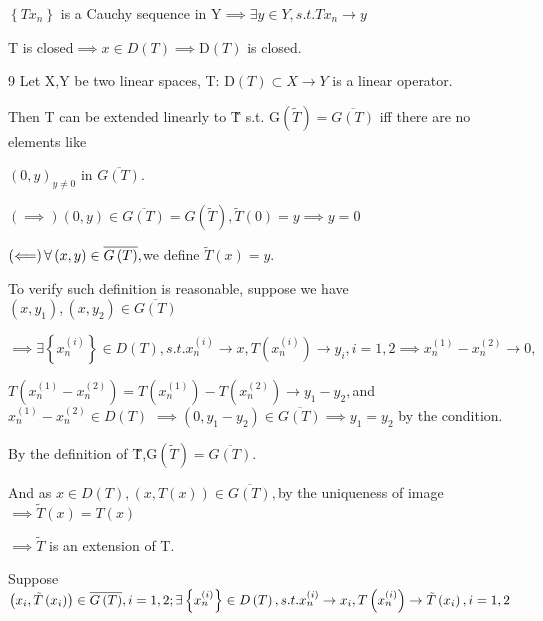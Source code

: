 \documentclass{article}
\begin{document}
\begin{CJK}{GBK}{song}
$\left\{ Tx_{n}\right\} $ is a Cauchy sequence in Y$\implies \exists y\in
Y,s.t.Tx_{n}\rightarrow y$

T is closed$\implies x\in D\left( T\right) \implies $D$\left( T\right) $ is
closed.

9 Let X,Y be two linear spaces, T: D$\left( T\right) \subset X\rightarrow Y$
is a linear operator.

Then T can be extended linearly to \~{T} s.t. G$\left( \tilde{T}\right) =%
\overline{G\left( T\right) }$ iff there are no elements like

$\left( 0,y\right) _{y\neq 0}$ in $\overline{G\left( T\right) }.$

$\left( \implies \right) \left( 0,y\right) \in \overline{G\left( T\right) }%
=G\left( \tilde{T}\right) ,\tilde{T}\left( 0\right) =y\implies y=0$

$\left( \Longleftarrow \right) \forall \left( x,y\right) \in \overline{%
G\left( T\right) },$we define $\tilde{T}\left( x\right) =y.$

To verify such definition is reasonable, suppose we have $\left(
x,y_{1}\right) ,\left( x,y_{2}\right) \in \overline{G\left( T\right) }$

$\implies \exists \left\{ x_{n}^{\left( i\right) }\right\} \in D\left(
T\right) ,s.t.x_{n}^{\left( i\right) }\rightarrow x,T\left( x_{n}^{\left(
i\right) }\right) \rightarrow y_{i},i=1,2\implies x_{n}^{\left( 1\right)
}-x_{n}^{\left( 2\right) }\rightarrow 0,$

$T\left( x_{n}^{\left( 1\right) }-x_{n}^{\left( 2\right) }\right) =T\left(
x_{n}^{\left( 1\right) }\right) -T\left( x_{n}^{\left( 2\right) }\right)
\rightarrow y_{1}-y_{2},$and $x_{n}^{\left( 1\right) }-x_{n}^{\left(
2\right) }\in D\left( T\right) $ $\implies \left( 0,y_{1}-y_{2}\right) \in 
\overline{G\left( T\right) }\implies y_{1}=y_{2}$ by the condition.

By the definition of \~{T},G$\left( \tilde{T}\right) =\overline{G\left(
T\right) }.$

And as $x\in D\left( T\right) ,\left( x,T\left( x\right) \right) \in 
\overline{G\left( T\right) },$by the uniqueness of image$\implies \tilde{T}%
\left( x\right) =T\left( x\right) $

$\implies \tilde{T}$ is an extension of T.

Suppose $\left( x_{i},\tilde{T}\left( x_{i}\right) \right) \in \overline{%
G\left( T\right) },i=1,2;\exists \left\{ x_{n}^{\left( i\right) }\right\}
\in D\left( T\right) ,s.t.x_{n}^{\left( i\right) }\rightarrow x_{i},T\left(
x_{n}^{\left( i\right) }\right) \rightarrow \tilde{T}\left( x_{i}\right)
,i=1,2$


\end{CJK}
\end{document}
